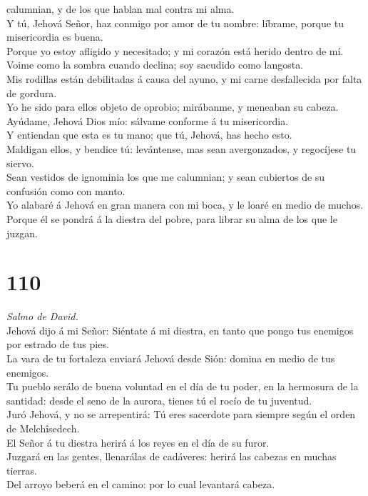 calumnian, y de los que hablan mal contra mi alma.\\
 Y tú, Jehová Señor, haz conmigo por amor de tu nombre:
líbrame, porque tu misericordia es buena.\\
 Porque yo estoy afligido y necesitado; y mi corazón está
herido dentro de mí.\\
 Voime como la sombra cuando declina; soy sacudido como
langosta.\\
 Mis rodillas están debilitadas á causa del ayuno, y mi
carne desfallecida por falta de gordura.\\
 Yo he sido para ellos objeto de oprobio; mirábanme, y
meneaban su cabeza.\\
 Ayúdame, Jehová Dios mío: sálvame conforme á tu
misericordia.\\
 Y entiendan que esta es tu mano; que tú, Jehová, has hecho
esto.\\
 Maldigan ellos, y bendice tú: levántense, mas sean
avergonzados, y regocíjese tu siervo.\\
 Sean vestidos de ignominia los que me calumnian; y sean
cubiertos de su confusión como con manto.\\
 Yo alabaré á Jehová en gran manera con mi boca, y le loaré
en medio de muchos.\\
 Porque él se pondrá á la diestra del pobre, para librar su
alma de los que le juzgan.

\hypertarget{section-109}{%
\section{110}\label{section-109}}

 \emph{Salmo de David.}\\
Jehová dijo á mi Señor: Siéntate á mi diestra, en tanto que pongo tus
enemigos por estrado de tus pies.\\
 La vara de tu fortaleza enviará Jehová desde Sión: domina
en medio de tus enemigos.\\
 Tu pueblo serálo de buena voluntad en el día de tu poder,
en la hermosura de la santidad: desde el seno de la aurora, tienes tú el
rocío de tu juventud.\\
 Juró Jehová, y no se arrepentirá: Tú eres sacerdote para
siempre según el orden de Melchîsedech.\\
 El Señor á tu diestra herirá á los reyes en el día de su
furor.\\
 Juzgará en las gentes, llenarálas de cadáveres: herirá las
cabezas en muchas tierras.\\
 Del arroyo beberá en el camino: por lo cual levantará
cabeza.

